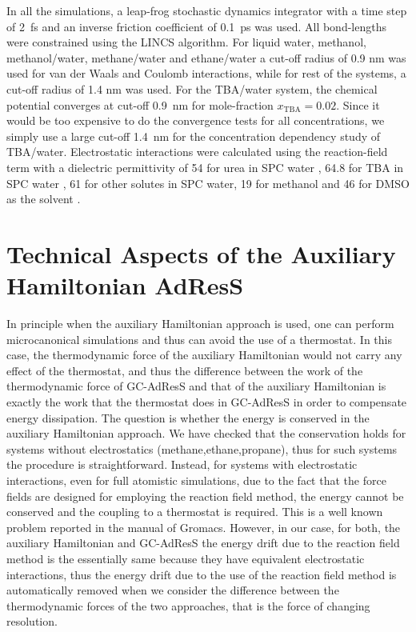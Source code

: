 \documentclass[a4paper,preprint,unsortedaddress]{revtex4-1}
\newcommand{\recheck}[1]{{\color{red} #1}}
\newcommand{\concenttba}{x_{\textrm{TBA}}}
\begin{document}
In all the simulations, a leap-frog stochastic dynamics integrator with a time step
of 2~fs and an inverse friction coefficient of 0.1~ps was used. All bond-lengths were constrained using the LINCS 
algorithm.
For liquid water, methanol,
methanol/water, methane/water and ethane/water  a cut-off radius of
0.9 nm was used for van der Waals and Coulomb interactions, while for rest of the systems,
a cut-off radius of 1.4 nm was used.
\recheck{
  For the TBA/water system, the chemical potential converges at cut-off 0.9~nm for mole-fraction $\concenttba=0.02$.
  Since it would be too expensive to do the convergence tests for
  all concentrations, we simply use a large cut-off 1.4~nm for the concentration dependency study of TBA/water.}
Electrostatic interactions  were calculated using the reaction-field term \cite{rf} with a dielectric 
permittivity of 54 for urea in SPC water \cite{urea}, 64.8 for TBA in SPC water \cite{nico}, 61 for other solutes in SPC
water, 19 for methanol and 46 for DMSO as the solvent \cite{vang}.

\section{Technical Aspects of the Auxiliary Hamiltonian AdResS}\label{app:tmp2}
\recheck{In principle when the auxiliary Hamiltonian approach is used,
  one can perform microcanonical simulations and thus can avoid the
  use of a thermostat. In this case, the thermodynamic force of the
  auxiliary Hamiltonian would not carry any effect of the thermostat, and thus the difference between the work of the thermodynamic force of GC-AdResS and that of the auxiliary Hamiltonian is
  exactly the work that the thermostat does in GC-AdResS in order to compensate energy dissipation. The question is whether
  the energy is conserved in the auxiliary Hamiltonian approach. We
  have checked that the conservation holds for systems without
  electrostatics (methane,ethane,propane), thus for such systems the
  procedure is straightforward. Instead, for systems with
  electrostatic interactions, even for full atomistic simulations, due
  to the fact that the force fields are designed for employing the
  reaction field method, the energy cannot be conserved and the
  coupling to a thermostat is required. This is a well known problem
  reported in the manual of Gromacs. However, in our case, for both,
  the auxiliary Hamiltonian and GC-AdResS the energy drift due to the
  reaction field method is the essentially same because they have
  equivalent electrostatic interactions, thus the energy drift due to
  the use of the reaction field method is automatically removed when
  we consider the difference between the thermodynamic forces of the
  two approaches, that is the force of changing resolution.}
\end{document}
